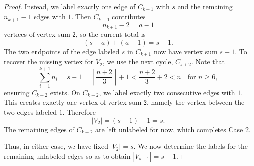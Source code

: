 \documentclass[10pt,a4paper]{amsart}
\begin{document}
\begin{proof}
Instead, we label exactly one edge of $C_{k+1}$ with $s$ and the remaining $n_{k+1}-1$ edges with $1$. Then $C_{k+1}$ contributes
\[
n_{k+1}-2=a-1
\]
vertices of vertex sum $2$, so the current total is
\[
(s-a)+(a-1)=s-1.
\]
The two endpoints of the edge labeled $s$ in $C_{k+1}$ now have vertex sum $s+1$. To recover the missing vertex for $V_2$, we use the next cycle, $C_{k+2}$. Note that
\[
\sum_{i=1}^{k+1} n_i = s+1 =\left\lceil\frac{n+2}{3}\right\rceil+1 < \frac{n+2}{3}  + 2< n \quad \text{for } n \ge 6,
\]
ensuring $C_{k+2}$ exists. On $C_{k+2}$, we label exactly two consecutive edges with $1$. This creates exactly one vertex of vertex sum $2$, namely the vertex between the two edges labeled $1$. Therefore
\[
|V_2|=(s-1)+1=s.
\]
The remaining edges of $C_{k+2}$ are left unlabeled for now, which completes Case 2.

\smallskip
\noindent
Thus, in either case, we have fixed $|V_2|=s$. We now determine the labels for the remaining unlabeled edges so as to obtain $|V_{s+1}| = s-1$.


\end{proof}
\end{document}
